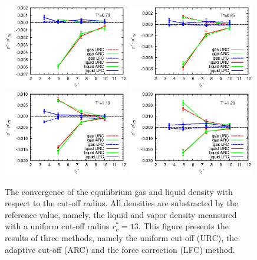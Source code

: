 \documentclass[aps,pre,preprint]{revtex4}
\begin{document}
\begin{figure}
  \centering
  \includegraphics[width=0.49\textwidth]{fig/converge/t0.70.eps} 
  \includegraphics[width=0.49\textwidth]{fig/converge/t0.85.eps} 
  \includegraphics[width=0.49\textwidth]{fig/converge/t1.10.eps} 
  \includegraphics[width=0.49\textwidth]{fig/converge/t1.20.eps} 
  \caption{The convergence of the equilibrium gas and liquid density
    with respect to the cut-off radius. All densities are substracted
    by the reference value, namely, the liquid and vapor density
    meansured with a uniform cut-off radius $r_c^\ast=13$. This figure
    presents the results of three methods, namely the uniform cut-off
    (URC), the adaptive cut-off (ARC) and the force correction (LFC)
    method. }
  \label{fig:tmp5}
\end{figure}
\end{document}

